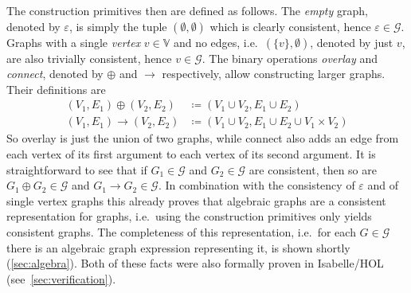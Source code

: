 \documentclass{article}
\renewcommand{\epsilon}{\varepsilon}
\newcommand{\eps}{\epsilon}
\newcommand{\overlay}{\oplus}
\newcommand{\connect}{\rightarrow}
\begin{document}
The construction primitives
then are defined as follows. The \textit{empty} graph, denoted by $\eps$, is
simply the tuple $(\emptyset, \emptyset)$ which is clearly consistent, hence
$\eps \in \mathcal{G}$. Graphs with a single \textit{vertex} $v \in
\mathbb{V}$ and no edges, i.e.\ $(\{v\}, \emptyset)$, denoted by just $v$, are also
trivially consistent, hence $v \in \mathcal{G}$. The binary operations
\textit{overlay} and \textit{connect}, denoted by $\overlay$ and $\connect$
respectively, allow constructing larger graphs. Their definitions are
\begin{align*}
  (V_1, E_1) \overlay (V_2, E_2) &\coloneqq (V_1 \cup V_2, E_1 \cup E_2)\\
  (V_1, E_1) \connect (V_2, E_2) &\coloneqq (V_1 \cup V_2, E_1 \cup E_2 \cup V_1 \times V_2)
\end{align*}
So overlay is just the union of two graphs, while connect also adds an edge from
each vertex of its first argument to each vertex of its second argument. It is
straightforward to see that if $G_1 \in \mathcal{G}$ and $G_2 \in \mathcal{G}$
are consistent, then so are $G_1 \overlay G_2 \in \mathcal{G}$ and $G_1 \connect
G_2 \in \mathcal{G}$. In combination with the consistency of $\eps$ and of single vertex
graphs this already proves that algebraic graphs are a consistent
representation for graphs, i.e.\ using the construction primitives only yields
consistent graphs. The completeness of this representation, i.e.\ for
each $G \in \mathcal{G}$ there is an algebraic graph expression representing it,
is shown shortly (\ref{sec:algebra}). Both of these facts were also formally proven in
Isabelle/HOL (see~\autoref{sec:verification}).
\end{document}
